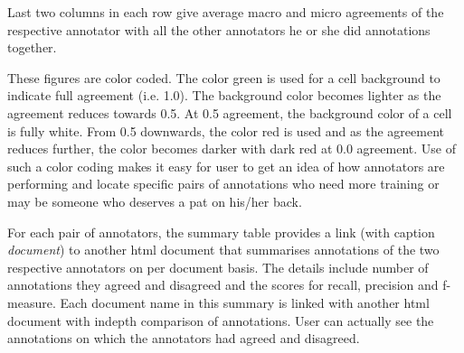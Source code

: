 Last two columns in each row give average macro and micro agreements of the
respective annotator with all the other annotators he or she did annotations 
together.

These figures are color coded. The color green is used for a cell background to 
indicate full agreement (i.e. 1.0). The background color becomes lighter as the 
agreement reduces towards 0.5.  At 0.5 agreement, the background color of a cell
is fully white. From 0.5 downwards, the color red is used and as the agreement 
reduces further, the color becomes darker with dark red at 0.0 agreement.  Use 
of such a color coding makes it easy for user to get an idea of how annotators 
are performing and locate specific pairs of annotations who need more training 
or may be someone who deserves a pat on his/her back.

For each pair of annotators, the summary table provides a link (with caption 
\textit{document}) to another html document that summarises annotations of the
two respective annotators on per document basis.  The details include number of
annotations they agreed and disagreed and the scores for recall, precision and 
f-measure.  Each document name in this summary is linked with another html 
document with indepth comparison of annotations.  User can actually see the 
annotations on which the annotators had agreed and disagreed.


%
%

%



